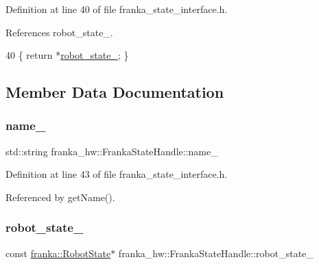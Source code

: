 Definition at line 40 of file franka\+\_\+state\+\_\+interface.\+h.



References robot\+\_\+state\+\_\+.


\begin{DoxyCode}
40 \{ \textcolor{keywordflow}{return} *\hyperlink{classfranka__hw_1_1FrankaStateHandle_ab4c6a16f32cb305e08d9f2a4514b2a77}{robot\_state\_}; \}
\end{DoxyCode}


\subsection{Member Data Documentation}
\mbox{\label{classfranka__hw_1_1FrankaStateHandle_a15abdf997d8480501d66250dab2fc6c8}} 
\subsubsection{\texorpdfstring{name\+\_\+}{name\_}}
{\footnotesize\ttfamily std\+::string franka\+\_\+hw\+::\+Franka\+State\+Handle\+::name\+\_\+\hspace{0.3cm}{\ttfamily [private]}}



Definition at line 43 of file franka\+\_\+state\+\_\+interface.\+h.



Referenced by get\+Name().

\mbox{\label{classfranka__hw_1_1FrankaStateHandle_ab4c6a16f32cb305e08d9f2a4514b2a77}} 
\subsubsection{\texorpdfstring{robot\+\_\+state\+\_\+}{robot\_state\_}}
{\footnotesize\ttfamily const \hyperlink{structfranka_1_1RobotState}{franka\+::\+Robot\+State}$\ast$ franka\+\_\+hw\+::\+Franka\+State\+Handle\+::robot\+\_\+state\+\_\+\hspace{0.3cm}{\ttfamily [private]}}



